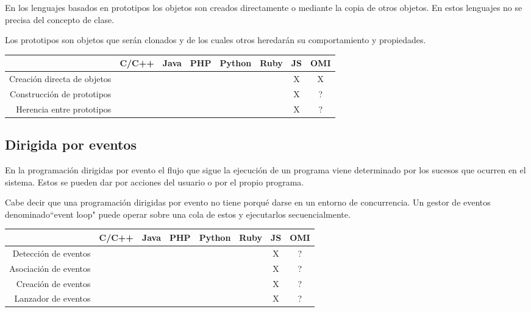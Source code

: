 En los lenguajes basados en prototipos los objetos son creados directamente o mediante
la copia de otros objetos. En estos lenguajes no se precisa del concepto de clase.

Los prototipos son objetos que serán clonados y de los cuales otros heredarán su
comportamiento y propiedades.

\FloatBarrier
\begin{table}[h]
\begin{center}
 
\begin{tabular}{|r|c|c|c|c|c|c|c|} \hline
 & C/C++ & Java &  PHP  & Python & Ruby & JS & OMI\\ \hline
Creación directa de objetos &  & &  &  &  & X & X \\ \hline
Construcción de prototipos &  & &  &  &  & X & ? \\ \hline
Herencia entre prototipos &  & &  &  &  & X & ? \\ \hline
\end{tabular}
\end{center}
\end{table}
\FloatBarrier

\subsection{Dirigida por eventos}
En la programación dirigidas por evento el flujo que sigue la ejecución de un programa viene 
determinado por los sucesos que ocurren en el sistema. Estos se pueden dar por acciones del usuario
o por el propio programa.

Cabe decir que una programación dirigidas por evento no tiene porqué darse en un 
entorno de concurrencia. Un gestor de eventos denominado``event loop" puede operar sobre 
una cola de estos y ejecutarlos secuencialmente.

\FloatBarrier
\begin{table}[h]
\begin{center}
 
\begin{tabular}{|r|c|c|c|c|c|c|c|} \hline
 & C/C++ & Java & PHP  & Python & Ruby & JS & OMI\\ \hline
Detección de eventos & & & & & & X & ? \\ \hline
Asociación de eventos & & & & & & X & ? \\ \hline  
Creación de eventos & & & & & & X & ? \\ \hline  
Lanzador de eventos & & & & & & X & ? \\ \hline  
\end{tabular}
\end{center}
\end{table}
\FloatBarrier

